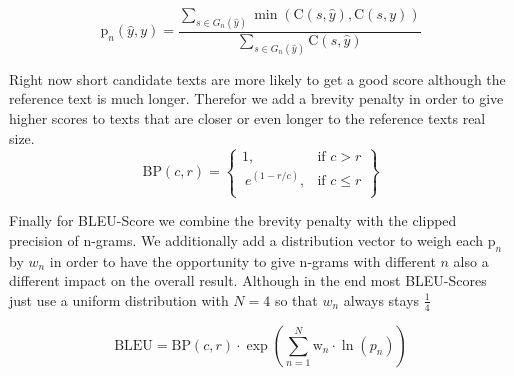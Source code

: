 \[
    \text{p}_n(\hat{y} , y) = \frac{\sum_{s \in G_n(\hat{y})} \min(\text{C}(s,\hat{y}), \text{C}(s,y))}{\sum_{s \in G_n(\hat{y})} \text{C}(s,\hat{y})}
\]


Right now short candidate texts are more likely to get a good score although the reference text is much longer. Therefor we add a brevity penalty in order to give higher scores to texts that are closer or even longer to the reference texts real size.
\[
    \text{BP}(c, r) = \left\{\begin{array}{lr}
        1,               & \text{if } c > r    \\
        \ e^{(1 - r/c)}, & \text{if } c \leq r \\
    \end{array}\right\}
\]

Finally for BLEU-Score we combine the brevity penalty with the clipped precision of n-grams. We additionally add a distribution vector to weigh each $ \text{p}_n$ by $w_n$ in order to have the opportunity to give n-grams with different $n$ also a different impact on the overall result. Although in the end most BLEU-Scores just use a uniform distribution with $N = 4$ so that $w_n$ always stays $\frac{1}{4}$

\[\text{BLEU} = \text{BP}(c, r) \cdot \exp\left(\sum_{n=1}^{N}  \text{w}_n \cdot \ln(p_n)\right)\]

